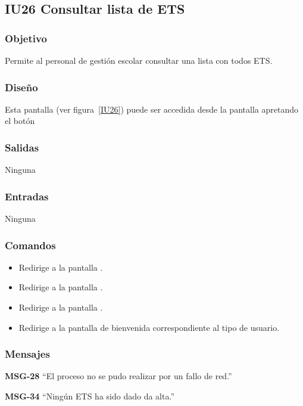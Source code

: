 
\subsection{IU26 Consultar lista de ETS}
\subsubsection{Objetivo}
    Permite al personal de gestión escolar consultar una lista con todos ETS.
\subsubsection{Diseño}
    Esta pantalla  (ver figura~\ref{IU26}) puede ser accedida desde la pantalla  apretando el botón 

\subsubsection{Salidas}
Ninguna
\subsubsection{Entradas}
Ninguna
\subsubsection{Comandos}
\begin{itemize}
    \item {} Redirige a la pantalla .
    \item {} Redirige a la pantalla .
    \item {} Redirige a la pantalla .
    \item {} Redirige a la pantalla de bienvenida correspondiente al tipo de usuario.
    
\end{itemize}

\subsubsection{Mensajes}

\begin{Citemize}
    \item {\bf MSG-28}  ``El proceso no se pudo realizar por un fallo de red.''
    \item {\bf MSG-34}  ``Ningún ETS ha sido dado da alta.''
\end{Citemize}

